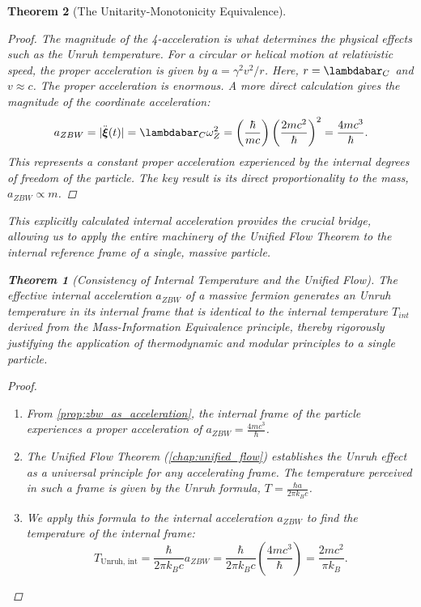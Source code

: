 \documentclass[11pt, letterpaper]{report}
\theoremstyle{plain} %
\newtheorem{theorem}{Theorem}[chapter]
\theoremstyle{definition} %
\theoremstyle{remark} %
\begin{document}
\begin{theorem}[The Unitarity-Monotonicity Equivalence]
\begin{proof}
The magnitude of the 4-acceleration is what determines the physical effects such as the Unruh temperature. For a circular or helical motion at relativistic speed, the proper acceleration is given by $a = \gamma^2 v^2/r$. Here, $r = \lambdabar_C$ and $v \approx c$. The proper acceleration is enormous. A more direct calculation gives the magnitude of the coordinate acceleration:
\begin{equation}
    a_{ZBW} = |\ddot{\boldsymbol{\xi}}(t)| = \lambdabar_C \omega_Z^2 = \left(\frac{\hbar}{mc}\right) \left(\frac{2mc^2}{\hbar}\right)^2 = \frac{4mc^3}{\hbar}.
\end{equation}
This represents a constant proper acceleration experienced by the internal degrees of freedom of the particle. The key result is its direct proportionality to the mass, $a_{ZBW} \propto m$.
\end{proof}

This explicitly calculated internal acceleration provides the crucial bridge, allowing us to apply the entire machinery of the Unified Flow Theorem to the internal reference frame of a single, massive particle.

\begin{theorem}[Consistency of Internal Temperature and the Unified Flow]
\label{thm:internal_temp_consistency}
The effective internal acceleration $a_{ZBW}$ of a massive fermion generates an Unruh temperature in its internal frame that is identical to the internal temperature $T_{int}$ derived from the Mass-Information Equivalence principle, thereby rigorously justifying the application of thermodynamic and modular principles to a single particle.
\end{theorem}
\begin{proof}
\begin{enumerate}
    \item From \cref{prop:zbw_as_acceleration}, the internal frame of the particle experiences a proper acceleration of $a_{ZBW} = \frac{4mc^3}{\hbar}$.

    \item The Unified Flow Theorem (\cref{chap:unified_flow}) establishes the Unruh effect as a universal principle for any accelerating frame. The temperature perceived in such a frame is given by the Unruh formula, $T = \frac{\hbar a}{2\pi k_B c}$.

    \item We apply this formula to the internal acceleration $a_{ZBW}$ to find the temperature of the internal frame:
    \begin{equation}
        T_{\text{Unruh, int}} = \frac{\hbar}{2\pi k_B c} a_{ZBW} = \frac{\hbar}{2\pi k_B c} \left( \frac{4mc^3}{\hbar} \right) = \frac{2mc^2}{\pi k_B}.
    \end{equation}


\end{enumerate}
\end{proof}
\end{theorem}
\end{document}
